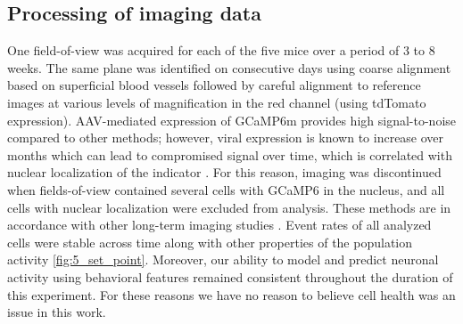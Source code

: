 \subsection{Processing of imaging data}
One field-of-view was acquired for each of the five mice over a period of 3 to 8 weeks. The same plane was identified on consecutive days using coarse alignment based on superficial blood vessels followed by careful alignment to reference images at various levels of magnification in the red channel (using tdTomato expression). AAV-mediated expression of GCaMP6m provides high signal-to-noise compared to other methods; however, viral expression is known to increase over months which can lead to compromised signal over time, which is correlated with nuclear localization of the indicator \citep{Chen2013, Tian2009}. For this reason, imaging was discontinued when fields-of-view contained several cells with GCaMP6 in the nucleus, and all cells with nuclear localization were excluded from analysis. These methods are in accordance with other long-term imaging studies \citep{Huber2012}. Event rates of all analyzed cells were stable across time along with other properties of the population activity \ref{fig:5_set_point}. Moreover, our ability to model and predict neuronal activity using behavioral features remained consistent throughout the duration of this experiment. For these reasons we have no reason to believe cell health was an issue in this work.

